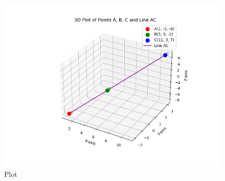 \documentclass{beamer}
\begin{document}
 


\begin{figure}
    \centering
    \includegraphics[width=0.8\columnwidth]{Fig.png}
    \caption{Plot}
    \label{fig:placeholder}
\end{figure}
\end{document}
